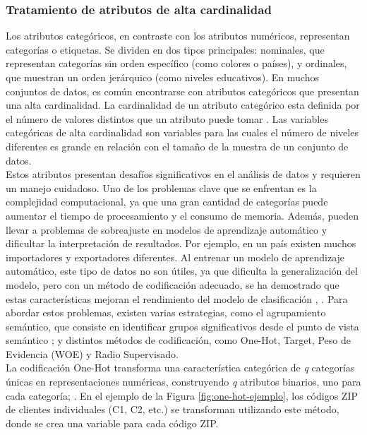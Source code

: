 \subsubsection*{Tratamiento de atributos de alta cardinalidad}\label{alta-cardinalidad}
Los atributos categóricos, en contraste con los atributos numéricos, representan categorías o etiquetas. Se dividen en dos tipos principales: nominales, que representan categorías sin orden específico (como colores o países), y ordinales, que muestran un orden jerárquico (como niveles educativos). En muchos conjuntos de datos, es común encontrarse con atributos categóricos que presentan una alta cardinalidad. La cardinalidad de un atributo categórico esta definida por el número de valores distintos que un atributo puede tomar \citep{moeyersoms2015including}. Las variables categóricas de alta cardinalidad son variables para las cuales el número de niveles diferentes es grande en relación con el tamaño de la muestra de un conjunto de datos. \\
Estos atributos presentan desafíos significativos en el análisis de datos y requieren un manejo cuidadoso. Uno de los problemas clave que se enfrentan es la complejidad computacional, ya que una gran cantidad de categorías puede aumentar el tiempo de procesamiento y el consumo de memoria. Además, pueden llevar a problemas de sobreajuste en modelos de aprendizaje automático y dificultar la interpretación de resultados. Por ejemplo, en un país existen muchos importadores y exportadores diferentes. Al entrenar un modelo de aprendizaje automático, este tipo de datos no son útiles, ya que dificulta la generalización del modelo, pero con un método de codificación adecuado, se ha demostrado que estas características mejoran el rendimiento del modelo de clasificación \citep{hooi2022feature}, \citep{cerda2020encoding}. Para abordar estos problemas, existen varias estrategias, como el agrupamiento semántico, que consiste en identificar grupos significativos desde el punto de vista semántico \citep{cerda2018similarity}; y distintos métodos de codificación, como One-Hot, Target, Peso de Evidencia (WOE) y Radio Supervisado. \\
La codificación One-Hot transforma una característica categórica de \textit{q} categorías únicas en representaciones numéricas, construyendo \textit{q} atributos binarios, uno para cada categoría; \citep{avanzi2023machine}. En el ejemplo de la Figura \ref{fig:one-hot-ejemplo}, los códigos ZIP de clientes individuales (C1, C2, etc.) se transforman utilizando este método, donde se crea una variable  para cada código ZIP. 
